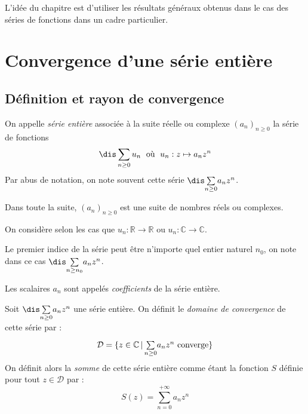 \documentclass[a4paper,10pt]{report}
\newcommand{\Sum}[2]{\ensuremath{\textstyle{\sum\limits_{#1}^{#2}}}}
\begin{document}


\noindent L'idée du chapitre est d'utiliser les résultats généraux obtenus dans le cas des séries de fonctions dans un cadre particulier.

\medskip

\section{Convergence d'une série entière}
\subsection{Définition et rayon de convergence}

\begin{defin} On appelle \textit{série entière} associée à la suite réelle ou complexe $(a_n)_{n \geq 0}$ la série de fonctions 
$$\dis \sum_{n \geq 0} u_n \; \hbox{ où } \; u_n : z \mapsto a_n z^n$$
Par abus de notation, on note souvent cette série $\dis \Sum{n \geq 0}{} a_n z^n$.
\end{defin}



\noindent Dans toute la suite, $(a_n)_{n \geq 0}$ est une suite de nombres réels ou complexes.

\medskip

\begin{rems} 
\item On considère selon les cas que $u_n : \mathbb{R} \rightarrow \mathbb{R}$ ou $u_n : \mathbb{C} \rightarrow \mathbb{C}$.
\item Le premier indice de la série peut être n'importe quel entier naturel $n_0$, on note dans ce cas $\dis \Sum{n \geq n_0}{} a_n z^n$.
\item Les scalaires $a_n$ sont appelés \textit{coefficients} de la série entière.
 \end{rems}
 
 \begin{defin} Soit $\dis \Sum{n \geq 0}{} a_n z^n$ une série entière. On définit le \textit{domaine de convergence} de cette série par :
 $$ \mathcal{D} = \lbrace z \in \mathbb{C} \, \vert \,  \Sum{n \geq 0}{} a_n z^n \hbox{ converge} \rbrace$$
 On définit alors la \textit{somme} de cette série entière comme étant la fonction $S$ définie pour tout $z \in \mathcal{D}$ par :
 $$ S(z) = \sum_{n=0}^{+ \infty} a_n z^n$$
 \end{defin}
 
\end{document}
